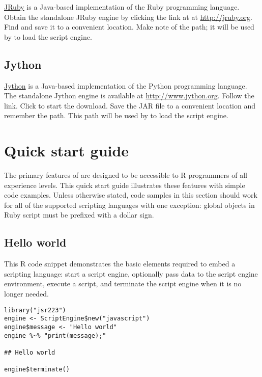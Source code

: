 \href{http://jruby.org}{JRuby} is a Java-based implementation of the Ruby programming language. Obtain the standalone JRuby engine by clicking the  link at at \url{http://jruby.org}. Find  and save it to a convenient location. Make note of the path; it will be used by  to load the script engine.

\subsection{Jython}

\href{http://www.jython.org}{Jython} is a Java-based implementation of the Python programming language. The standalone Jython engine is available at \url{http://www.jython.org}. Follow the  link. Click  to start the download. Save the JAR file to a convenient location and remember the path. This path will be used by  to load the script engine.

\hypertarget{quickstartguide}{\section{Quick start guide}}

The primary features of  are designed to be accessible to R programmers of all experience levels. This quick start guide illustrates these features with simple code examples. Unless otherwise stated, code samples in this section should work for all of the supported scripting languages with one exception: global objects in Ruby script must be prefixed with a dollar sign.%

\subsection{Hello world}

This R code snippet demonstrates the basic elements required to embed a scripting language: start a script engine, optionally pass data to the script engine environment, execute a script, and terminate the script engine when it is no longer needed.

\begin{verbatim}
library("jsr223")
engine <- ScriptEngine$new("javascript")
engine$message <- "Hello world"
engine %~% "print(message);"

## Hello world

engine$terminate()
\end{verbatim}

